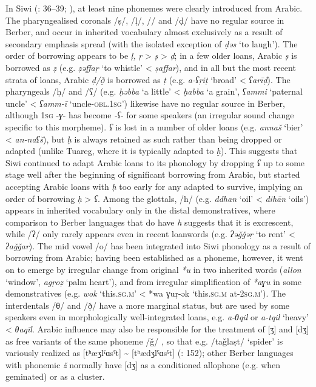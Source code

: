 \documentclass[output=paper]{langsci/langscibook}
\begin{document}
In Siwi (\citealt{Souag2013book}: 36–39; \citealt{SouagvanPutten2016}), at least nine phonemes were clearly introduced from Arabic.  The pharyngealised coronals /ṣ/, /ḷ/, /\R/ and /ḍ/ have no regular source in Berber, and occur in inherited vocabulary almost exclusively as a result of secondary emphasis spread (with the isolated exception of \textit{ḍəs} `to laugh').  The order of borrowing appears to be \textit{ḷ,} \textit{ṛ} > \textit{ṣ} > \textit{ḍ}; in a few older loans, Arabic \textit{ṣ} is borrowed as \textit{ẓ} (e.g. \textit{ẓəffaṛ} `to whistle' < \textit{ṣaffar}), and in all but the most recent strata of loans, Arabic \textit{ḍ/ð̣} is borrowed as \textit{ṭ} (e.g. \textit{a-ʕṛiṭ} `broad' < \textit{ʕarīḍ}).  The pharyngeals /ḥ/ and /ʕ/ (e.g. \textit{ḥəbba} `a little' < \textit{ḥabba} `a grain', \textit{ʕammi} `paternal uncle' < \textit{ʕamm-ī} `uncle-\textsc{obl.1sg}') likewise have no regular source in Berber, although 1\textsc{sg} -\textit{ɣ}{}- has become \textit{{}-ʕ}{}- for some speakers (an irregular sound change specific to this morpheme). \textit{ʕ} is lost in a number of older loans (e.g. \textit{annaš} `bier' < \textit{an-naʕš}), but \textit{ḥ} is always retained as such rather than being dropped or adapted (unlike Tuareg, where it is typically adapted to \textit{ḫ}).  This suggests that Siwi continued to adapt Arabic loans to its phonology by dropping \textit{ʕ} up to some stage well after the beginning of significant borrowing from Arabic, but started accepting Arabic loans with \textit{ḥ} too early for any adapted to survive, implying an order of borrowing \textit{ḥ} > \textit{ʕ}. Among the glottals, /h/ (e.g. \textit{ddhan} `oil' < \textit{dihān} `oils') appears in inherited vocabulary only in the distal demonstratives, where comparison to Berber languages that do have \textit{h} suggests that it is excrescent, while /ʔ/ only rarely appears even in recent loanwords (e.g. \textit{ʔəǧǧəṛ} `to rent' < \textit{ʔaǧǧar}). The mid vowel /o/ has been integrated into Siwi phonology as a result of borrowing from Arabic; having been established as a phoneme, however, it went on to emerge by irregular change from original \textit{*u} in two inherited words (\textit{allon} `window', \textit{agṛoẓ} `palm heart'), and from irregular simplification of \textit{*aɣu} in some demonstratives (e.g. \textit{wok} `this\textsc{.sg.m}' < *wa ɣuṛ-ək `this.\textsc{sg.m} at-\textsc{2sg.m')}. The interdentals /θ/ and /ð̣/ have a more marginal status, but are used by some speakers even in morphologically well-integrated loans, e.g. \textit{a-θqil} or \textit{a-tqil} `heavy' < \textit{θaqīl}. Arabic influence may also be responsible for the treatment of [ʒ] and [dʒ] as free variants of the same phoneme /ǧ/ \citep{Vycichl2005}, so that e.g. /taǧlaṣt/ `spider' is variously realized as [tʰæʒlˤɑsˤt] {\textasciitilde} [tʰædʒlˤɑsˤt] (\citealt{Naumann2012}: 152); other Berber languages with phonemic \textit{ž} normally have [dʒ] as a conditioned allophone (e.g. when geminated) or as a cluster.
\end{document}
